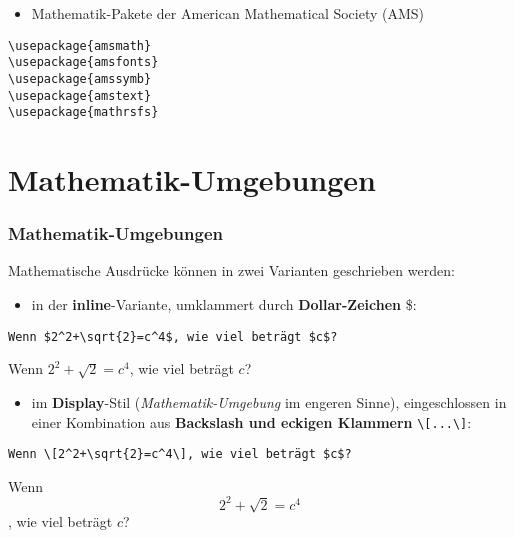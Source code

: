 \begin{frame}[fragile]


\begin{itemize}
	\item Mathematik-Pakete der American Mathematical Society (AMS)
	
\end{itemize}

\begin{lstlisting}
\usepackage{amsmath}
\usepackage{amsfonts}
\usepackage{amssymb}
\usepackage{amstext}
\usepackage{mathrsfs}
\end{lstlisting}

\end{frame}


\section{Mathematik-Umgebungen}

\begin{frame}[fragile]
\frametitle{Mathematik-Umgebungen}


Mathematische Ausdrücke können in zwei Varianten geschrieben werden:

\begin{itemize}
	\item in der \textbf{inline}-Variante, umklammert durch \textbf{Dollar-Zeichen} \$:
\end{itemize}

\begin{lstlisting}
Wenn $2^2+\sqrt{2}=c^4$, wie viel beträgt $c$?
\end{lstlisting}
 
\ea Wenn $2^2+\sqrt{2}=c^4$, wie viel beträgt $c$?
\z 

\pause 

\begin{itemize}
	\item im \textbf{Display}-Stil (\emph{Mathematik-Umgebung} im engeren Sinne), eingeschlossen
in einer Kombination aus \textbf{Backslash und eckigen Klammern} \lstinline|\[...\]|:
\end{itemize}

\begin{lstlisting}
Wenn \[2^2+\sqrt{2}=c^4\], wie viel beträgt $c$?
\end{lstlisting}

\ea Wenn \[2^2+\sqrt{2}=c^4\], wie viel beträgt $c$?
\z 

\end{frame}


